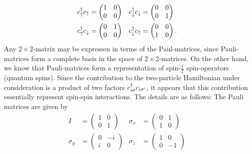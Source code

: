 \begin{align*}
	c^{\dagger}_{\uparrow}c_{\uparrow} &= \begin{pmatrix}
		1 & 0\\0&0
	\end{pmatrix} &
	c^{\dagger}_{\downarrow}c_{\downarrow} &= \begin{pmatrix}
	0 & 0\\0&1
\end{pmatrix} \\
c^{\dagger}_{\uparrow}c_{\downarrow} &= \begin{pmatrix}
	0 & 1\\0&0
\end{pmatrix} &
c^{\dagger}_{\downarrow}c_{\uparrow} &= \begin{pmatrix}
	0 & 0\\1&0
\end{pmatrix}.
\end{align*}
Any $2\times2$-matrix may be expressen in terms of the Paul-matrices, since Pauli-matrices form a complete basis in the space of $2\times2$-matrices.
On the other hand, we know that Pauli-matrices form a representation of spin-$\frac12$ spin-operators (quantum spins). 
Since the contribution to the two-particle Hamiltonian under consideration is a product of two factors $c^{\dagger}_{i\sigma}c_{i\sigma'}$, it appears that this contribution essentially represent spin-spin interactions. 
The details are as follows: 
The Pauli matrices are given by
\begin{align}
	I &= \begin{pmatrix}
		1 &0\\0&1
	\end{pmatrix}  & 	
	\sigma_x &= \begin{pmatrix}
		0& 1\\1&0
	\end{pmatrix} \\
\sigma_y &= \begin{pmatrix}
	0&-i \\ i & 0
\end{pmatrix} & \sigma_z &= \begin{pmatrix}
1&0 \\0&-1
\end{pmatrix}
\end{align}

